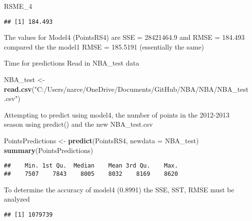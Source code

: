 \documentclass[]{article}
\newenvironment{Shaded}{\begin{snugshade}}{\end{snugshade}}
\newcommand{\KeywordTok}[1]{\textcolor[rgb]{0.13,0.29,0.53}{\textbf{{#1}}}}
\newcommand{\DataTypeTok}[1]{\textcolor[rgb]{0.13,0.29,0.53}{{#1}}}
\newcommand{\DecValTok}[1]{\textcolor[rgb]{0.00,0.00,0.81}{{#1}}}
\newcommand{\StringTok}[1]{\textcolor[rgb]{0.31,0.60,0.02}{{#1}}}
\newcommand{\NormalTok}[1]{{#1}}
\begin{document}
\begin{Shaded}
\begin{Highlighting}[]
\NormalTok{RSME_4}
\end{Highlighting}
\end{Shaded}

\begin{verbatim}
## [1] 184.493
\end{verbatim}

The values for Model4 (PointsRS4) are SSE = 28421464.9 and RMSE =
184.493 compared the the model1 RMSE = 185.5191 (essentially the same)

Time for predictions Read in NBA\_test data

\begin{Shaded}
\begin{Highlighting}[]
\NormalTok{NBA_test <-}\StringTok{ }\KeywordTok{read.csv}\NormalTok{(}\StringTok{"C:/Users/narce/OneDrive/Documents/GitHub/NBA/NBA/NBA_test.csv"}\NormalTok{)}
\end{Highlighting}
\end{Shaded}

Attempting to predict using model4, the number of points in the
2012-2013 season using predict() and the new NBA\_test.csv

\begin{Shaded}
\begin{Highlighting}[]
\NormalTok{PointsPredictions <-}\StringTok{ }\KeywordTok{predict}\NormalTok{(PointsRS4, }\DataTypeTok{newdata =} \NormalTok{NBA_test)}
\KeywordTok{summary}\NormalTok{(PointsPredictions)}
\end{Highlighting}
\end{Shaded}

\begin{verbatim}
##    Min. 1st Qu.  Median    Mean 3rd Qu.    Max. 
##    7507    7843    8005    8032    8169    8620
\end{verbatim}

To determine the accuracy of model4 (0.8991) the SSE, SST, RMSE must be
analyzed

\begin{Shaded}
\end{Shaded}

\begin{verbatim}
## [1] 1079739
\end{verbatim}
\end{document}
